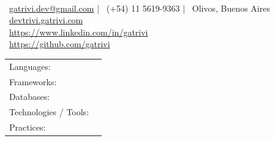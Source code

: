 \documentclass[]{awesome-cv}
\begin{document}
\begin{center}
	  \\
	\vspace{2mm}
	{\hspace{0.8cm}\faEnvelope\ \href{mailto:gatrivi.dev@gmail.com}{gatrivi.dev@gmail.com}}  |
	{\faMobile\ (+54) 11 5619-9363}  |
	{\faMapMarker\ Olivos, Buenos Aires} \\
	{\faLink\ \href{https://devtrivi.gatrivi.com}{devtrivi.gatrivi.com}} \\
	{\faLink\ \href{https://www.linkedin.com/in/gatrivi}{https://www.linkedin.com/in/gatrivi}} \\
	{\faLink\ \href{https://github.com/gatrivi}{https://github.com/gatrivi}}
\end{center}

\begin{cventries}
	\cventry
	{}
	{\def\arraystretch{1.15}{\begin{tabular}{ l l }
		Languages:  & {\skill{JavaScript, TypeScript, HTML, CSS}} \\
		Frameworks:  & {\skill{React 19, Node.js, Express.js}} \\
		Databases:  & {\skill{kvdb.io, idb-keyval, Google Drive}} \\
		Technologies / Tools: \hspace{0.05cm} & {\skill{Vite 6, Tailwind CSS v4, Framer Motion, Deepgram, Google Translate, Gemini API, Vercel, Netlify, Git, CI/CD}} \\
		Practices:  & {\skill{Production reliability, zero-downtime deployment workflows, structured JSON schema outputs, prompt/schema enforcement, performance troubleshooting}} \\
		\end{tabular}}}
	{}
	{}
	{}
\end{cventries}
\vspace{-7mm}
\end{document}
